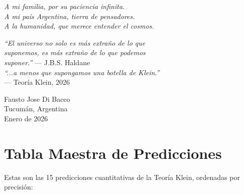\begin{flushright}
\textit{A mi familia, por su paciencia infinita.}\\
\textit{A mi país Argentina, tierra de pensadores.}\\
\textit{A la humanidad, que merece entender el cosmos.}
\end{flushright}

\vspace{1cm}

\begin{center}
\begin{minipage}{0.8\textwidth}
\centering
\textit{``El universo no solo es más extraño de lo que\\
suponemos, es más extraño de lo que podemos\\
suponer.''} --- J.B.S. Haldane\\[0.5cm]

\textit{``...a menos que supongamos una botella de Klein.''}\\
--- Teoría Klein, 2026
\end{minipage}
\end{center}

\vspace{1cm}

\begin{flushright}
Fausto Jose Di Bacco\\
Tucumán, Argentina\\
Enero de 2026
\end{flushright}


\newpage
\section*{Tabla Maestra de Predicciones}

Estas son las 15 predicciones cuantitativas de la Teoría Klein, ordenadas por precisión:

